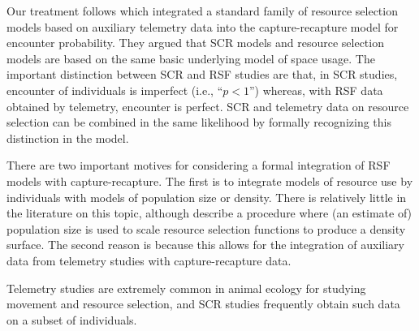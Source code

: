 Our treatment follows
\citet{royle_etal:2012mee} which integrated a standard family of
resource selection models based on auxiliary telemetry data into the
capture-recapture model for encounter probability.
They  argued that SCR models and resource
selection models \citep{manly_etal:2002} are based on the same basic
underlying model of space usage. The important distinction between SCR
and RSF studies are that, in SCR studies, encounter of individuals is
imperfect (i.e., ``$p<1$'') whereas, with RSF data obtained by
telemetry, encounter is perfect. 
SCR and telemetry data on resource selection can be combined in the
same likelihood by formally recognizing this distinction in the model.  

There are two important motives for considering a formal integration
of RSF models with capture-recapture. The first is to integrate models
of resource use by individuals with models of population size or
density. There is relatively little in the literature on this topic,
although   
\citet{boyce_mcdonald:1999}
describe a procedure where (an
estimate of) population size is used to scale resource selection
functions to produce a density surface. The second reason is because
this allows for the integration of auxiliary data from telemetry
studies with capture-recapture data. 


Telemetry studies are extremely common in animal ecology for studying
movement and resource selection, and SCR studies frequently obtain
such data on a subset of individuals. 

